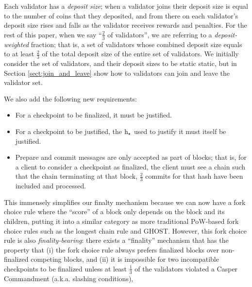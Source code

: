 \documentclass[12pt, final]{article}
\newcommand{\hash}{\textnormal{h}\xspace}
\newcommand{\hashsource}{\ensuremath{\hash_{\star}}\xspace}
\begin{document}
Each validator has a \textit{deposit size}; when a validator joins their deposit size is equal to the number of coins that they deposited, and from there on each validator's deposit size rises and falls as the validator receives rewards and penalties. For the rest of this paper, when we say ``$\frac{2}{3}$ of validators'', we are referring to a \textit{deposit-weighted} fraction; that is, a set of validators whose combined deposit size equals to at least $\frac{2}{3}$ of the total deposit size of the entire set of validators.  We initially consider the set of validators, and their deposit sizes to be static static, but in Section \ref{sect:join_and_leave} show how to validators can join and leave the validator set.


We also add the following new requirements:

\begin{itemize}
\item For a checkpoint to be finalized, it must be justified.
\item For a checkpoint to be justified, the \hashsource used to justify it must itself be justified.
\item Prepare and commit messages are only accepted as part of blocks; that is, for a client to consider a checkpoint as finalized, the client must see a chain  such that the chain terminating at that block, $\frac{2}{3}$ commits for that hash have been included and processed.
\end{itemize}

This immensely simplifies our finalty mechanism because we can now have a fork choice rule where the ``score'' of a block only depends on the block and its children, putting it into a similar category as more traditional PoW-based fork choice rules such as the longest chain rule and GHOST\cite{sompolinsky2013accelerating}. However, this fork choice rule is also \textit{finality-bearing}: there exists a ``finality'' mechanism that has the property that (i) the fork choice rule always prefers finalized blocks over non-finalized competing blocks, and (ii) it is impossible for two incompatible checkpoints to be finalized unless at least $\frac{1}{3}$ of the validators violated a Casper Commandment (a.k.a. slashing conditions),
\end{document}
